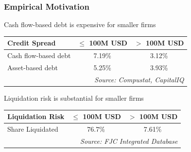 \documentclass[aspectratio=169,xcolor=table]{beamer}
\begin{document}
\appendix

\begin{frame}[label=empirics] \frametitle{Empirical Motivation \hfill \hyperlink{motivation}{}}

Cash flow-based debt is expensive for smaller firms
\footnotesize
\begin{table}[h]
    \centering
    \renewcommand{\arraystretch}{1}
    \begin{tabular}{lcc}
        \toprule
        \textbf{Credit Spread} & \textbf{$\leq$ 100M USD} & \textbf{$>$ 100M USD} \\
        \midrule
        Cash flow-based debt & 7.19\% & 3.12\% \\
        Asset-based debt     & 5.25\% & 3.93\% \\
        \bottomrule
        & \multicolumn{2}{r}{\textit{\scriptsize Source: Compustat, CapitalIQ}} \\
    \end{tabular}
\end{table}
\normalsize \vspace{2mm}

Liquidation risk is substantial for smaller firms
\footnotesize
\begin{table}[h]
    \centering
    \renewcommand{\arraystretch}{1}
    \begin{tabular}{lcc}
        \toprule
        \textbf{Liquidation Risk} & \textbf{$\leq$ 100M USD} & \textbf{$>$ 100M USD} \\
        \midrule
        Share Liquidated & 76.7\% & 7.61\% \\
        \bottomrule
        & \multicolumn{2}{r}{\textit{\scriptsize Source: FJC Integrated Database}} \\
    \end{tabular}
\end{table}
\normalsize

\end{frame}
\end{document}
